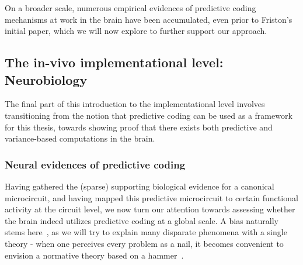 On a broader scale, numerous empirical evidences of predictive coding mechanisms at work in the brain have been accumulated, even prior to Friston's initial paper, which we will now explore to further support our approach.



\newpage 



\subsection{The in-vivo implementational level: Neurobiology}
The final part of this introduction to the implementational level involves transitioning from the notion that predictive coding can be used as a framework for this thesis, towards showing proof that there exists both predictive and variance-based computations in the brain.




\subsubsection{Neural evidences of predictive coding}
Having gathered the (sparse) supporting biological evidence for a canonical microcircuit, and having mapped this predictive microcircuit to certain functional activity at the circuit level, we now turn our attention towards assessing whether the brain indeed utilizes predictive coding at a global scale. A bias naturally stems here~\cite{shipp2016neural}, as we will try to explain many disparate phenomena with a single theory - when one perceives every problem as a nail, it becomes convenient to envision a normative theory based on a hammer~\cite{maslow1966psychology}. 

